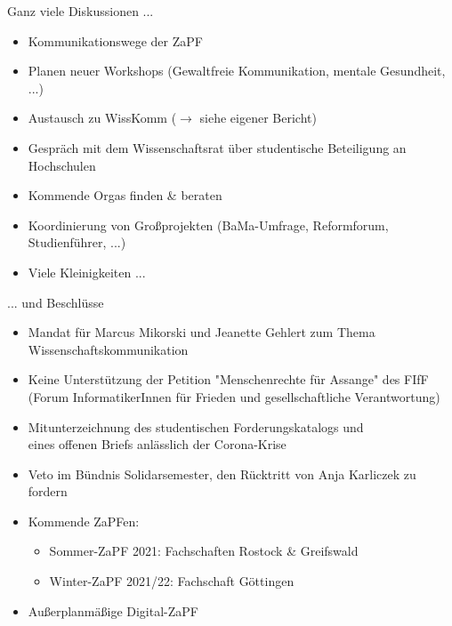 \documentclass[compress, aspectratio=169]{beamer}
\begin{document}
\begin{frame}{Ganz viele Diskussionen ...}
  \begin{itemize}
    \item Kommunikationswege der ZaPF
    \item Planen neuer Workshops (Gewaltfreie Kommunikation, mentale Gesundheit, ...)
    \item Austausch zu WissKomm ($\rightarrow$ siehe eigener Bericht)
    \item Gespräch mit dem Wissenschaftsrat über studentische Beteiligung an Hochschulen
    \item Kommende Orgas finden \& beraten
    \item Koordinierung von Großprojekten (BaMa-Umfrage, Reformforum, Studienführer, ...)
    \item Viele Kleinigkeiten ...
  \end{itemize}
\end{frame}

\begin{frame}{... und Beschlüsse}
  \begin{itemize}
      \item Mandat für Marcus Mikorski und Jeanette Gehlert zum Thema Wissenschaftskommunikation
      \item Keine Unterstützung der Petition "Menschenrechte für Assange" des FIfF (Forum InformatikerInnen für Frieden und gesellschaftliche Verantwortung)
      \item Mitunterzeichnung des studentischen Forderungskatalogs und \\
      eines offenen Briefs anlässlich der Corona-Krise
      \item Veto im Bündnis Solidarsemester, den Rücktritt von Anja Karliczek zu fordern
      \item Kommende ZaPFen:
        \begin{itemize}
          \item Sommer-ZaPF 2021: Fachschaften Rostock \& Greifswald
          \item Winter-ZaPF 2021/22: Fachschaft Göttingen
        \end{itemize}
    \item Außerplanmäßige Digital-ZaPF
  \end{itemize}
\end{frame}
\end{document}
